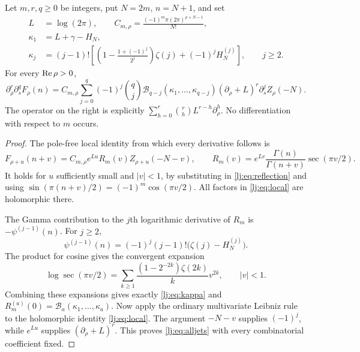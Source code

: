\begin{theorem}
\label{lj:thm:oddjets}
Let $m,r,q\geq0$ be integers, put $N=2m$, $n=N+1$, and set
\begin{align}
 L&=\log(2\pi),\qquad
 C_{m,\rho}=\frac{(-1)^m\pi(2\pi)^{\rho+N-1}}{N!},
 \label{lj:eq:C}\\
 \kappa_1&=L+\gamma-H_N,\nonumber\\
 \kappa_j&=(j-1)!\left[
       \left(1-\frac{1+(-1)^j}{2^j}\right)\zeta(j)
       +(-1)^jH_N^{(j)}\right],\qquad j\geq2.
 \label{lj:eq:kappa}
\end{align}
For every $\operatorname{Re}\rho>0$,
\begin{equation}
 \boxed{\displaystyle
 \partial_\rho^r\partial_s^qF_\rho(n)
 =C_{m,\rho}\sum_{j=0}^q(-1)^j\binom qj
       \mathcal B_{q-j}(\kappa_1,\ldots,\kappa_{q-j})
       (\partial_\rho+L)^r\partial_s^jZ_\rho(-N).}
 \label{lj:eq:alljets}
\end{equation}
The operator on the right is explicitly
$\sum_{h=0}^r\binom rh L^{r-h}\partial_\rho^h$.
No differentiation with respect to $m$ occurs.
\end{theorem}

\begin{proof}
The pole-free local identity from which every derivative follows is
\begin{equation}
 F_{\rho+u}(n+v)=C_{m,\rho}e^{Lu}
       R_m(v)Z_{\rho+u}(-N-v),
 \qquad
 R_m(v)=e^{Lv}\frac{\Gamma(n)}{\Gamma(n+v)}
                  \sec(\pi v/2).
 \label{lj:eq:local}
\end{equation}
It holds for $u$ sufficiently small and $|v|<1$, by substituting in
\eqref{lj:eq:reflection} and using
$\sin(\pi(n+v)/2)=(-1)^m\cos(\pi v/2)$.
All factors in \eqref{lj:eq:local} are holomorphic there.

The Gamma contribution to the $j$th logarithmic derivative of $R_m$
is $-\psi^{(j-1)}(n)$. For $j\geq2$,
\[
 \psi^{(j-1)}(n)=(-1)^j(j-1)!
                         \bigl(\zeta(j)-H_N^{(j)}\bigr).
\]
The product for cosine gives the convergent expansion
\[
 \log\sec(\pi v/2)
   =\sum_{k\geq1}\frac{(1-2^{-2k})\zeta(2k)}{k}v^{2k},
   \qquad |v|<1.
\]
Combining these expansions gives exactly \eqref{lj:eq:kappa} and
$R_m^{(a)}(0)=\mathcal B_a(\kappa_1,\ldots,\kappa_a)$.
Now apply the ordinary multivariate Leibniz rule to the holomorphic
identity \eqref{lj:eq:local}. The argument $-N-v$ supplies $(-1)^j$,
while $e^{Lu}$ supplies $(\partial_\rho+L)^r$. This proves
\eqref{lj:eq:alljets} with every combinatorial coefficient fixed.
\end{proof}

